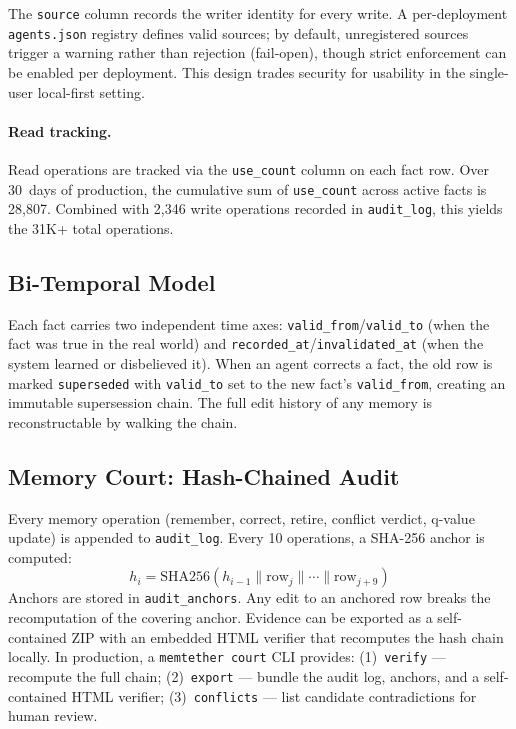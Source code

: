 \documentclass{article}
\begin{document}
The \texttt{source} column records the writer identity for every write. A per-deployment \texttt{agents.json} registry defines valid sources; by default, unregistered sources trigger a warning rather than rejection (fail-open), though strict enforcement can be enabled per deployment. This design trades security for usability in the single-user local-first setting.

\paragraph{Read tracking.}
Read operations are tracked via the \texttt{use\_count} column on each fact row. Over 30~days of production, the cumulative sum of \texttt{use\_count} across active facts is 28{,}807. Combined with 2{,}346 write operations recorded in \texttt{audit\_log}, this yields the 31K+ total operations.

\subsection{Bi-Temporal Model}
Each fact carries two independent time axes: \texttt{valid\_from}/\texttt{valid\_to} (when the fact was true in the real world) and \texttt{recorded\_at}/\texttt{invalidated\_at} (when the system learned or disbelieved it). When an agent corrects a fact, the old row is marked \texttt{superseded} with \texttt{valid\_to} set to the new fact's \texttt{valid\_from}, creating an immutable supersession chain. The full edit history of any memory is reconstructable by walking the chain.

\subsection{Memory Court: Hash-Chained Audit}
Every memory operation (remember, correct, retire, conflict verdict, q-value update) is appended to \texttt{audit\_log}. Every 10 operations, a SHA-256 anchor is computed:
\[
h_i = \text{SHA256}(h_{i-1} \| \text{row}_{j} \| \cdots \| \text{row}_{j+9})
\]
Anchors are stored in \texttt{audit\_anchors}. Any edit to an anchored row breaks the recomputation of the covering anchor. Evidence can be exported as a self-contained ZIP with an embedded HTML verifier that recomputes the hash chain locally. In production, a \texttt{memtether court} CLI provides: (1)~\texttt{verify} --- recompute the full chain; (2)~\texttt{export} --- bundle the audit log, anchors, and a self-contained HTML verifier; (3)~\texttt{conflicts} --- list candidate contradictions for human review.
\end{document}
